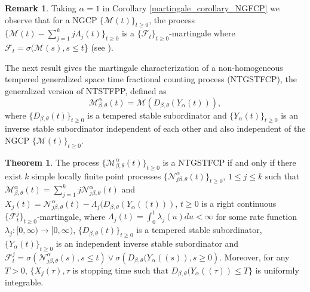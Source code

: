 \documentclass[11pt,oneside,reqno]{amsart}
\theoremstyle{definition}
\newtheorem{theorem}{\bf Theorem}[section]
\newtheorem{remark}{\bf Remark}[section]
\theoremstyle{remarkstyle}
\begin{document}
\begin{remark}
Taking $\alpha=1$ in Corollary \ref{martingale_corollary_NGFCP} we observe that for a NGCP $\{\mathcal{M}(t)\}_{t\ge 0}$, the process $\{\mathcal{M}(t)-\sum_{j=1}^{k}j\Lambda_j(t)\}_{t\ge 0}$ is a $\{\mathcal{F}_t\}_{t\ge 0}$-martingale where $\mathcal{F}_t = \sigma(\mathcal{M}(s),s\le t$\} (see \citet{Kataria2025}).
\end{remark}
The next result gives the martingale characterization of a non-homogeneous tempered generalized space time fractional counting process (NTGSTFCP), the generalized version of NTSTFPP, defined as
\begin{equation}\label{definition_NTGSTFCP}
    \mathcal{M}^{\alpha}_{\beta,\theta}(t)=\mathcal{M}\left(D_{\beta,\theta}(Y_{\alpha}(t))\right),
\end{equation}
where $\{D_{\beta,\theta}(t)\}_{t\ge 0}$ is a tempered stable subordinator and $\{Y_{\alpha}(t)\}_{t\ge 0}$ is an inverse stable subordinator independent of each other and also independent of the NGCP $\{\mathcal{M}(t)\}_{t\ge 0}$.
\begin{theorem}\label{Watanabe_characterization_NTGSTFCP}
    The process $\{\mathcal{M}^\alpha_{\beta,\theta}(t)\}_{t\ge 0}$ is a NTGSTFCP if and only if there exist $k$ simple locally finite point processes $\{\mathcal{N}^\alpha_{j\beta,\theta}(t)\}_{t\ge 0}$, $1\le j\le k$ such that $\mathcal{M}^\alpha_{\beta,\theta}(t)=\sum_{j=1}^{k}j\mathcal{N}^{\alpha}_{j\beta,\theta}(t)$ and $X_j(t)=\mathcal{N}^{\alpha}_{j\beta,\theta}(t)-\Lambda_j(D_{\beta,\theta}(Y_{\alpha}((t)))$, $t\ge 0$ is a right continuous $\{\mathcal{F}_t^j\}_{t\ge 0}$-martingale, where $\Lambda_j(t)=\int_{0}^{t}\lambda_j(u)du<\infty$ for some rate function $\lambda_j:[0,\infty)\to[0,\infty)$, $\{D_{\beta,\theta}(t)\}_{t\ge 0}$ is a tempered stable subordinator, $\{Y_{\alpha}(t)\}_{t\ge 0}$ is an independent inverse stable subordinator and $\mathcal{F}_t^j=\sigma\left(\mathcal{N}^{\alpha}_{j\beta,\theta}(s),s\le t\right)\vee\sigma\left(D_{\beta,\theta}(Y_{\alpha}((s)),s\ge 0\right)$. Moreover, for any $T>0$, $\{X_j(\tau),\tau\,\, \text{is stopping time such that}\,\,D_{\beta,\theta}(Y_{\alpha}((\tau))\le T\}$ is uniformly integrable.
\end{theorem}
\end{document}
